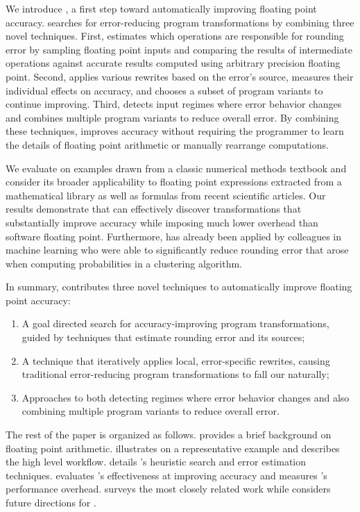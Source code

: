 \documentclass[paper.tex]{subfiles}
\begin{document}
We introduce \casio, a first step toward automatically improving
floating point accuracy.  \casio searches for error-reducing program
transformations by combining three novel techniques.  First, \casio
estimates which operations are responsible for rounding error by
sampling floating point inputs and comparing the results of
intermediate operations against accurate results computed using
arbitrary precision floating point.  Second, \casio applies various
rewrites based on the error's source, measures their individual
effects on accuracy, and chooses a subset of program variants to
continue improving.  Third, \casio detects input regimes where error
behavior changes and combines multiple program variants to reduce
overall error.  By combining these techniques, \casio improves
accuracy without requiring the programmer to learn the details of
floating point arithmetic or manually rearrange computations.

We evaluate \casio on examples drawn from a classic numerical methods
textbook and consider its broader applicability to floating point
expressions extracted from a mathematical library as well as formulas
from recent scientific articles.  Our results demonstrate that \casio
can effectively discover transformations that substantially improve
accuracy while imposing much lower overhead than software floating
point.  Furthermore, \casio has already been applied by colleagues in
machine learning who were able to significantly reduce rounding error
that arose when computing probabilities in a clustering algorithm.

In summary, \casio contributes three novel techniques to automatically
improve floating point accuracy:
\begin{enumerate}
\item A goal directed search for accuracy-improving program
  transformations, guided by techniques that estimate rounding error
  and its sources;
\item A technique that iteratively applies local, error-specific
  rewrites, causing traditional error-reducing program transformations
  to fall our naturally;
\item Approaches to both detecting regimes where error behavior
  changes and also combining multiple program variants to reduce
  overall error.
\end{enumerate}

The rest of the paper is organized as follows.  
provides a brief background on floating point arithmetic.
 illustrates \casio on a representative example and
describes the high level \casio workflow.  
details \casio's heuristic search and error estimation techniques.
 evaluates \casio's effectiveness at improving
accuracy and measures \casio's performance overhead.
 surveys the most closely related work while
 considers future directions for \casio.
\end{document}
